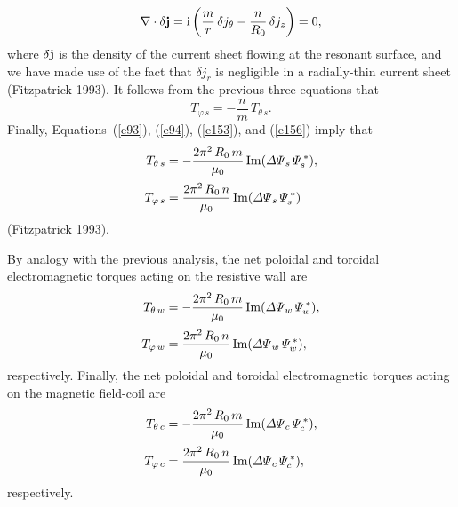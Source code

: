 \documentclass[notitlepage,12pt]{article}
\begin{document}
\begin{equation}
\nabla \cdot \delta {\bf j} = {\rm i}\left(\frac{m}{r}\,\delta j_\theta - \frac{n}{R_0}\,\delta j_z\right) = 0,
\end{equation}
where $\delta{\bf j}$ is the density of the current sheet flowing at the resonant surface, and we have made use
of the fact that $\delta j_r$ is negligible in a radially-thin current sheet (Fitzpatrick 1993). 
 It follows from the previous three equations that
\begin{equation}\label{e156}
T_{\varphi\,s} = - \frac{n}{m}\,T_{\theta\,s}.
\end{equation}
Finally, Equations~(\ref{e93}), (\ref{e94}), (\ref{e153}), and (\ref{e156}) imply that
\begin{align}\label{e157}
T_{\theta\,s} &= -\frac{2\pi^2\,R_0\,m}{\mu_0}\,{\rm Im}({\mit\Delta\Psi}_s\,{\mit\Psi}_s^{\,\ast}),\\[0.5ex]
T_{\varphi\,s} &= \frac{2\pi^2\,R_0\,n}{\mu_0}\,{\rm Im}({\mit\Delta\Psi}_s\,{\mit\Psi}_s^{\,\ast})\label{e158}
\end{align}
(Fitzpatrick 1993).

By analogy with the previous analysis,  the net poloidal and toroidal electromagnetic torques acting on the
resistive wall are 
\begin{align}
T_{\theta\,w} &= -\frac{2\pi^2\,R_0\,m}{\mu_0}\,{\rm Im}({\mit\Delta\Psi}_w\,{\mit\Psi}_w^{\,\ast}),\\[0.5ex]
T_{\varphi\,w} &= \frac{2\pi^2\,R_0\,n}{\mu_0}\,{\rm Im}({\mit\Delta\Psi}_w\,{\mit\Psi}_w^{\,\ast}),
\end{align}
respectively. 
Finally, 
the net poloidal and toroidal electromagnetic torques acting on the
magnetic field-coil are 
\begin{align}
T_{\theta\,c} &= -\frac{2\pi^2\,R_0\,m}{\mu_0}\,{\rm Im}({\mit\Delta\Psi}_c\,{\mit\Psi}_c^{\,\ast}),\\[0.5ex]
T_{\varphi\,c} &= \frac{2\pi^2\,R_0\,n}{\mu_0}\,{\rm Im}({\mit\Delta\Psi}_c\,{\mit\Psi}_c^{\,\ast}),\label{e166}
\end{align}
respectively. 
\end{document}
